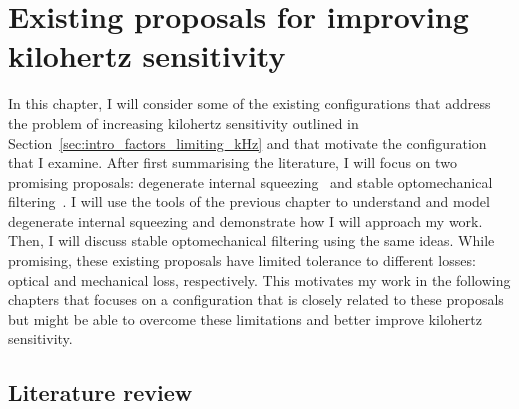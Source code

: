\chapter{Existing proposals for improving kilohertz sensitivity} %
\label{chp:proposals}

In this chapter, I will consider some of the existing configurations that address the problem of increasing kilohertz sensitivity outlined in Section~\ref{sec:intro_factors_limiting_kHz} and that motivate the configuration that I examine. After first summarising the literature, I will focus on two promising proposals: degenerate internal squeezing~\cite{} and stable optomechanical filtering~\cite{}. I will use the tools of the previous chapter to understand and model degenerate internal squeezing and demonstrate how I will approach my work. Then, I will discuss stable optomechanical filtering using the same ideas. %
While promising, these existing proposals have limited tolerance to different losses: optical and mechanical loss, respectively. This motivates my work in the following chapters that focuses on a configuration that is closely related to these proposals but might be able to overcome these limitations and better improve kilohertz sensitivity.


\section{Literature review}
\label{sec:literature_review}


